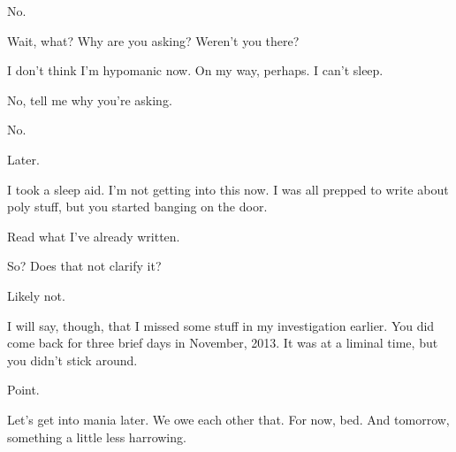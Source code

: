 
No.

Wait, what? Why are you asking? Weren't you there?


I don't think I'm hypomanic now. On my way, perhaps. I can't sleep.


No, tell me why you're asking.


No.

Later.

I took a sleep aid. I'm not getting into this now. I was all prepped to write about poly stuff, but you started banging on the door.

Read what I've already written. %


So? Does that not clarify it?


Likely not.

I will say, though, that I missed some stuff in my investigation earlier. You did come back for three brief days in November, 2013. It was at a liminal time, but you didn't stick around.


Point.

Let's get into mania later. We owe each other that. For now, bed. And tomorrow, something a little less harrowing.

